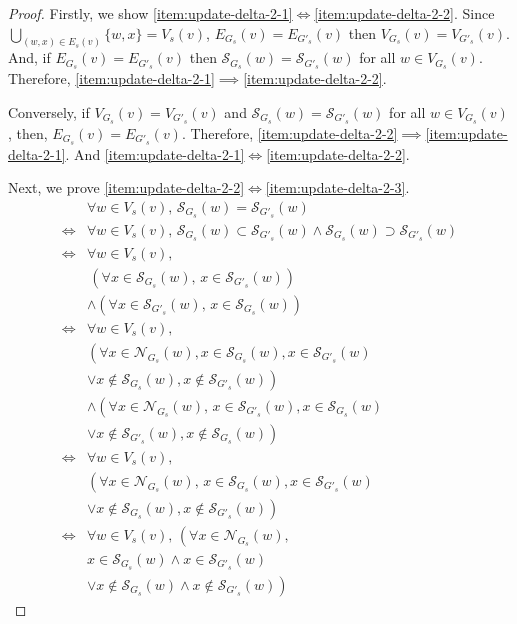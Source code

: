 \documentclass[twocolumn]{article}
\begin{document}
  \begin{proof}
    Firstly, we show \ref{item:update-delta-2-1}$\iff$\ref{item:update-delta-2-2}.
    Since $\bigcup_{(w,x)\in E_s(v)}\{w,x\}=V_s(v)$, $E_{G_s}(v)=E_{G'_s}(v)$ then $V_{G_s}(v)=V_{G'_s}(v)$.
    And, if $E_{G_s}(v)=E_{G'_s}(v)$ then $\mathcal{S}_{G_s}(w)=\mathcal{S}_{G'_s}(w)$ for all $w\in V_{G_s}(v)$. Therefore, \ref{item:update-delta-2-1}$\implies$\ref{item:update-delta-2-2}.

    Conversely, if $V_{G_s}(v)=V_{G'_s}(v)$ and $\mathcal{S}_{G_s}(w)=\mathcal{S}_{G'_s}(w)$ for all $w\in V_{G_s}(v)$, then, $E_{G_s}(v)=E_{G'_s}(v)$.
    Therefore, \ref{item:update-delta-2-2}$\implies$\ref{item:update-delta-2-1}.
    And \ref{item:update-delta-2-1}$\iff$\ref{item:update-delta-2-2}.

    Next, we prove \ref{item:update-delta-2-2}$\iff$\ref{item:update-delta-2-3}.
    \begin{equation*}
      \begin{aligned}
        &\forall w\in V_s(v),\,\mathcal{S}_{G_s}(w)=\mathcal{S}_{G'_s}(w)\\
        \iff&\forall w\in V_s(v),\,\mathcal{S}_{G_s}(w)\subset\mathcal{S}_{G'_s}(w)
        \land\mathcal{S}_{G_s}(w)\supset\mathcal{S}_{G'_s}(w)\\
        \iff&\forall w\in V_s(v),\\
        &\,\left(\forall x\in\mathcal{S}_{G_s}(w),\,x\in\mathcal{S}_{G'_s}(w)\right)\\
        &\land\left(\forall x\in\mathcal{S}_{G'_s}(w),\,x\in\mathcal{S}_{G_s}(w)\right)\\
        \iff&\forall w\in V_s(v),\\
        &\left(\forall x\in\mathcal{N}_{G_s}(w),x\in\mathcal{S}_{G_s}(w),x\in\mathcal{S}_{G'_s}(w)\right.\\
        &\left.\lor x\notin\mathcal{S}_{G_s}(w),x\notin\mathcal{S}_{G'_s}(w)\right)\\
        &\land\left(\forall x\in\mathcal{N}_{G_s}(w),\,x\in\mathcal{S}_{G'_s}(w),x\in\mathcal{S}_{G_s}(w)\right.\\
        &\left.\lor x\notin\mathcal{S}_{G'_s}(w),x\notin\mathcal{S}_{G_s}(w)\right)\\
        \iff&\forall w\in V_s(v),\\
        &\left(\forall x\in\mathcal{N}_{G_s}(w),\,
        x\in\mathcal{S}_{G_s}(w),x\in\mathcal{S}_{G'_s}(w)\right.\\
        &\left.\lor x\notin\mathcal{S}_{G_s}(w),x\notin\mathcal{S}_{G'_s}(w)\right)\\
        \iff&\forall w\in V_s(v),\,\left(\forall x\in\mathcal{N}_{G_s}(w),\right.\\
        &\left.x\in\mathcal{S}_{G_s}(w)\land x\in\mathcal{S}_{G'_s}(w)\right.\\
        &\left.\lor x\notin\mathcal{S}_{G_s}(w)\land x\notin\mathcal{S}_{G'_s}(w)\right)
      \end{aligned}
    \end{equation*}
  \end{proof}
\end{document}
